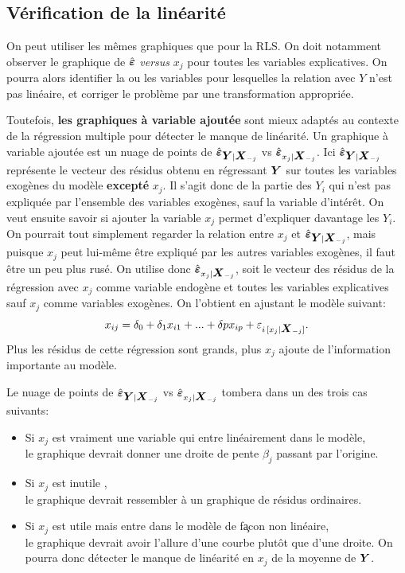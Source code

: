 \subsection{Vérification de la linéarité}

On peut utiliser les mêmes graphiques que pour la RLS. On doit notamment observer le graphique de  $\hat{\mbox{\boldmath$\varepsilon$\unboldmath}}$ \textit{versus} $x_j$ pour toutes les variables explicatives. On pourra alors identifier la ou les variables pour lesquelles la relation avec $Y$ n'est pas linéaire, et corriger le problème par une transformation appropriée.


Toutefois, \textbf{les graphiques à variable ajoutée} sont mieux adaptés au contexte de la régression multiple pour détecter le manque de linéarité. Un graphique à variable ajoutée est un nuage de points de $\hat{\mbox{\boldmath$\varepsilon$\unboldmath}}_{\mbox{\boldmath$Y$\unboldmath}|\mbox{\boldmath$X$\unboldmath}_{-j}}$ vs $\hat{\mbox{\boldmath$\varepsilon$\unboldmath}}_{x_j|\mbox{\boldmath$X$\unboldmath}_{-j}}$. Ici $\hat{\mbox{\boldmath$\varepsilon$\unboldmath}}_{\mbox{\boldmath$Y$\unboldmath}|\mbox{\boldmath$X$\unboldmath}_{-j}}$ représente le vecteur des
résidus obtenu en régressant $\mbox{\boldmath$Y$\unboldmath}$ sur toutes les variables
exogènes du modèle \textbf{excepté} $x_j$. Il s'agit donc de la partie des $Y_i$ qui n'est pas expliquée par l'ensemble des variables exogènes, sauf la variable d'intérêt.  On veut ensuite savoir si ajouter la variable $x_j$ permet d'expliquer davantage les $Y_i$.  On pourrait tout simplement regarder la relation entre $x_j$ et $\hat{\mbox{\boldmath$\varepsilon$\unboldmath}}_{\mbox{\boldmath$Y$\unboldmath}|\mbox{\boldmath$X$\unboldmath}_{-j}}$, mais puisque $x_j$ peut lui-même être expliqué par les autres variables exogènes, il faut être un peu plus rusé. On utilise donc $\hat{\mbox{\boldmath$\varepsilon$\unboldmath}}_{x_j|\mbox{\boldmath$X$\unboldmath}_{-j}}$, soit le vecteur des résidus de la régression avec $x_j$ comme variable endogène et toutes les variables explicatives sauf $x_j$ comme variables exogènes. On l'obtient en ajustant le modèle suivant:
\begin{equation*}
  x_{ij} = \delta_0+\delta_1x_{i1}+...+\delta{p}x_{ip} +\varepsilon_{i\,[x_j|\mbox{\boldmath$X$\unboldmath}_{-j}]}.
\end{equation*}
Plus les résidus de cette régression sont grands, plus $x_j$ ajoute de l'information importante au modèle.

Le nuage de points de $\hat{\mbox{\boldmath$\varepsilon$\unboldmath}}_{\mbox{\boldmath$Y$\unboldmath}|\mbox{\boldmath$X$\unboldmath}_{-j}}$ vs $\hat{\mbox{\boldmath$\varepsilon$\unboldmath}}_{x_j|\mbox{\boldmath$X$\unboldmath}_{-j}}$ tombera dans un des trois cas suivants:
\begin{itemize}
\item Si $x_j$ est vraiment une variable qui entre linéairement dans le modèle, \\
 le graphique devrait donner une droite de pente $\beta_j$ passant par l'origine.
\item  Si $x_j$ est \og inutile \fg, \\
le graphique devrait ressembler à un graphique de
résidus ordinaires.
\item  Si $x_j$ est utile mais entre dans le modèle de fa\c{}con non linéaire,\\
 le graphique devrait avoir l'allure d'une courbe plut\^ot que d'une droite.  On pourra donc détecter le manque de linéarité en $x_j$ de la moyenne de $\mbox{\boldmath$Y$\unboldmath}$.
\end{itemize}

